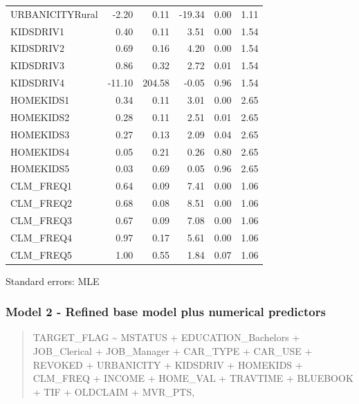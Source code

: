 \documentclass[]{article}
\begin{document}
\begin{table}[!h]
\begin{threeparttable}
\begin{tabular}{lrrrrr}
URBANICITYRural & -2.20 & 0.11 & -19.34 & 0.00 & 1.11\\
\rowcolor{gray!6}  KIDSDRIV1 & 0.40 & 0.11 & 3.51 & 0.00 & 1.54\\
\addlinespace
KIDSDRIV2 & 0.69 & 0.16 & 4.20 & 0.00 & 1.54\\
\rowcolor{gray!6}  KIDSDRIV3 & 0.86 & 0.32 & 2.72 & 0.01 & 1.54\\
KIDSDRIV4 & -11.10 & 204.58 & -0.05 & 0.96 & 1.54\\
\rowcolor{gray!6}  HOMEKIDS1 & 0.34 & 0.11 & 3.01 & 0.00 & 2.65\\
HOMEKIDS2 & 0.28 & 0.11 & 2.51 & 0.01 & 2.65\\
\addlinespace
\rowcolor{gray!6}  HOMEKIDS3 & 0.27 & 0.13 & 2.09 & 0.04 & 2.65\\
HOMEKIDS4 & 0.05 & 0.21 & 0.26 & 0.80 & 2.65\\
\rowcolor{gray!6}  HOMEKIDS5 & 0.03 & 0.69 & 0.05 & 0.96 & 2.65\\
CLM\_FREQ1 & 0.64 & 0.09 & 7.41 & 0.00 & 1.06\\
\rowcolor{gray!6}  CLM\_FREQ2 & 0.68 & 0.08 & 8.51 & 0.00 & 1.06\\
\addlinespace
CLM\_FREQ3 & 0.67 & 0.09 & 7.08 & 0.00 & 1.06\\
\rowcolor{gray!6}  CLM\_FREQ4 & 0.97 & 0.17 & 5.61 & 0.00 & 1.06\\
CLM\_FREQ5 & 1.00 & 0.55 & 1.84 & 0.07 & 1.06\\
\bottomrule
\end{tabular}
\begin{tablenotes}
\item Standard errors: MLE
\end{tablenotes}
\end{threeparttable}
\end{table}

\newpage

\subsubsection{Model 2 - Refined base model plus numerical
predictors}\label{model-2---refined-base-model-plus-numerical-predictors}

\begin{quote}
TARGET\_FLAG \textasciitilde{} MSTATUS + EDUCATION\_Bachelors +
JOB\_Clerical + JOB\_Manager + CAR\_TYPE + CAR\_USE + REVOKED +
URBANICITY + KIDSDRIV + HOMEKIDS + CLM\_FREQ + INCOME + HOME\_VAL +
TRAVTIME + BLUEBOOK + TIF + OLDCLAIM + MVR\_PTS,
\end{quote}
\end{document}
